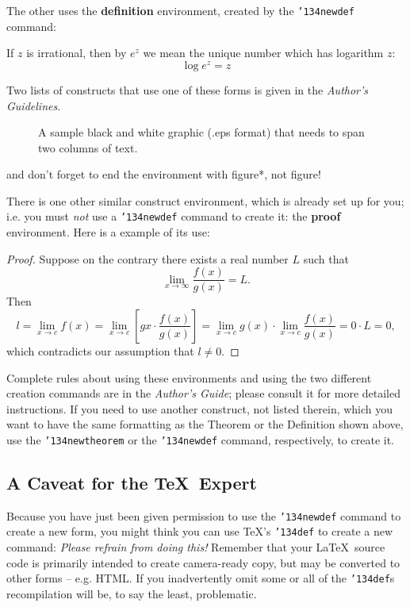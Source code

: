 \documentclass{acm_proc_article-sp}
\begin{document}
The other uses the \textbf{definition} environment, created
by the \texttt{{\char'134}newdef} command:
\begin{definition}
If $z$ is irrational, then by $e^z$ we mean the
unique number which has
logarithm $z$: \begin{displaymath}{\log e^z = z}\end{displaymath}
\end{definition}

Two lists of constructs that use one of these
forms is given in the
\textit{Author's  Guidelines}.

\begin{figure*}
\centering
\caption{A sample black and white graphic (.eps format)
that needs to span two columns of text.}
\end{figure*}
and don't forget to end the environment with
{figure*}, not {figure}!
 
There is one other similar construct environment, which is
already set up
for you; i.e. you must \textit{not} use
a \texttt{{\char'134}newdef} command to
create it: the \textbf{proof} environment.  Here
is a example of its use:
\begin{proof}
Suppose on the contrary there exists a real number $L$ such that
\begin{displaymath}
\lim_{x\rightarrow\infty} \frac{f(x)}{g(x)} = L.
\end{displaymath}
Then
\begin{displaymath}
l=\lim_{x\rightarrow c} f(x)
= \lim_{x\rightarrow c}
\left[ g{x} \cdot \frac{f(x)}{g(x)} \right ]
= \lim_{x\rightarrow c} g(x) \cdot \lim_{x\rightarrow c}
\frac{f(x)}{g(x)} = 0\cdot L = 0,
\end{displaymath}
which contradicts our assumption that $l\neq 0$.
\end{proof}

Complete rules about using these environments and using the
two different creation commands are in the
\textit{Author's Guide}; please consult it for more
detailed instructions.  If you need to use another construct,
not listed therein, which you want to have the same
formatting as the Theorem
or the Definition\cite{salas:calculus} shown above,
use the \texttt{{\char'134}newtheorem} or the
\texttt{{\char'134}newdef} command,
respectively, to create it.

\subsection*{A {\secit Caveat} for the \TeX\ Expert}
Because you have just been given permission to
use the \texttt{{\char'134}newdef} command to create a
new form, you might think you can
use \TeX's \texttt{{\char'134}def} to create a
new command: \textit{Please refrain from doing this!}
Remember that your \LaTeX\ source code is primarily intended
to create camera-ready copy, but may be converted
to other forms -- e.g. HTML. If you inadvertently omit
some or all of the \texttt{{\char'134}def}s recompilation will
be, to say the least, problematic.
\end{document}
